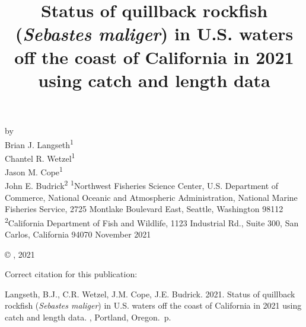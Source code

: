 \documentclass[11pt,
  english,
  letterpaper,
]{article}
\date{}
\newcommand{\trTitle}{Status of quillback rockfish (\emph{Sebastes maliger}) in U.S. waters off the coast of California in 2021 using catch and length data}
\newcommand{\trYear}{2021}
\newcommand{\trMonth}{November}
\newcommand{\trAuthsBack}{Langseth, B.J., C.R. Wetzel, J.M. Cope, J.E. Budrick}
\newcommand{\trCitation}{
\begin{hangparas}{1em}{1}
\trAuthsBack{}. \trYear{}. \trTitle{}. \glsentrylong{pfmc}, Portland, Oregon. \pageref{LastPage}{}\,p.
\end{hangparas}}
\begin{document}

\renewcommand*{\thefootnote}{\fnsymbol{footnote}}

\small
\thispagestyle{empty}
\noindent
\begin{center}
\title{Status of quillback rockfish (\emph{Sebastes maliger}) in U.S. waters off the coast of California in 2021 using catch and length data}
\vspace{1.5cm}
{\Large\textbf{}}
\vfill
by\\
Brian J. Langseth\textsuperscript{1}\\
Chantel R. Wetzel\textsuperscript{1}\\
Jason M. Cope\textsuperscript{1}\\
John E. Budrick\textsuperscript{2}\vfill
\textsuperscript{1}Northwest Fisheries Science Center, U.S. Department of Commerce, National Oceanic and Atmospheric Administration, National Marine Fisheries Service, 2725 Montlake Boulevard East, Seattle, Washington 98112\\
\textsuperscript{2}California Department of Fish and Wildlife, 1123 Industrial Rd., Suite 300, San Carlos, California 94070\vfill
\trMonth{} \trYear{}
\end{center}
\clearpage

\thispagestyle{empty}
\vspace*{\fill}
\begin{center}
\copyright{} , \trYear{}\\
\end{center}
\par
\bigskip
\noindent
Correct citation for this publication:
\bigskip
\par
\trCitation{}
\clearpage


\tableofcontents\clearpage
\label{TRlastRoman}
\clearpage

\newpage
\thispagestyle{empty} %

\pagestyle{plain}  %
\renewcommand*{\thefootnote}{\arabic{footnote}}  %
\setcounter{footnote}{0}  %
\renewcommand{\headrulewidth}{0.5pt}
\renewcommand{\footrulewidth}{0.5pt}
\end{document}
